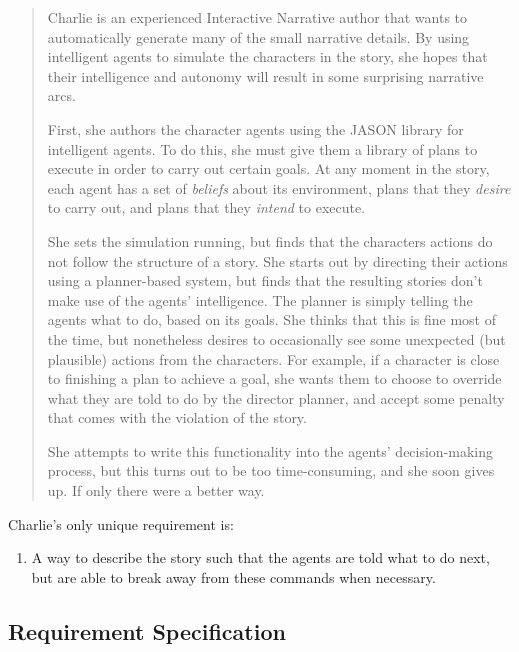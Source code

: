 \documentclass[11pt]{report}
\begin{document}
\begin{quote}
  Charlie is an experienced Interactive Narrative author that wants to
  automatically generate many of the small narrative details. By using
  intelligent agents to simulate the characters in the story, she hopes that
  their intelligence and autonomy will result in some surprising narrative arcs.

  First, she authors the character agents using the JASON library for
  intelligent agents. To do this, she must give them a library of plans to
  execute in order to carry out certain goals. At any moment in the story, each agent has a set of
  \emph{beliefs} about its environment, plans that they \emph{desire} to carry
  out, and plans that they \emph{intend} to execute.

  She sets the simulation running, but finds that the characters actions do not
  follow the structure of a story. She starts out by directing their actions using a planner-based system, but
  finds that the resulting stories don't make use of the agents' intelligence.
  The planner is simply telling the agents what to do, based on its goals. She
  thinks that this is fine most of the time, but nonetheless desires to
  occasionally see some unexpected (but plausible) actions from the characters.
  For example, if a character is close to finishing a plan to achieve a goal,
  she wants them to  choose to override what they are told to do by the director
  planner, and accept some penalty that comes with the violation of the story.

  She attempts to write this functionality into the agents' decision-making
  process, but this turns out to be too time-consuming, and she soon gives up.
  If only there were a better way.
\end{quote}

Charlie's only unique requirement is:

\begin{enumerate}[{Charlie} R1.]
  \item A way to describe the story such that the agents are told what to do
    next, but are able to break away from these commands when necessary.\label{req:charlie1}
\end{enumerate}

\subsection{Requirement Specification}
\label{sec:requirements}
\end{document}
